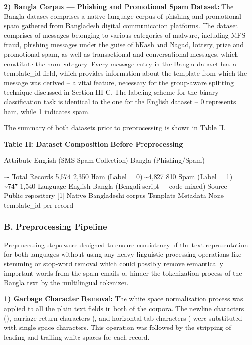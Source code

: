 \textbf{2) Bangla Corpus --- Phishing and Promotional Spam Dataset:} The
Bangla dataset comprises a native language corpus of phishing and
promotional spam gathered from Bangladesh digital communication
platforms. The dataset comprises of messages belonging to various
categories of malware, including MFS fraud, phishing messages under the
guise of bKash and Nagad, lottery, prize and promotional spam, as well
as transactional and conversational messages, which constitute the ham
category. Every message entry in the Bangla dataset has a template\_id
field, which provides information about the template from which the
message was derived -- a vital feature, necessary for the group-aware
splitting technique discussed in Section III-C. The labeling scheme for
the binary classification task is identical to the one for the English
dataset -- 0 represents ham, while 1 indicates spam.

The summary of both datasets prior to preprocessing is shown in Table
II.

\textbf{Table II: Dataset Composition Before Preprocessing}

Attribute \textbar{} English (SMS Spam Collection) \textbar{} Bangla
(Phishing/Spam) \textbar{}

\textbar--\textbar-\textbar\textbar{} \textbar{} Total Records
\textbar{} 5,574 \textbar{} 2,350 \textbar{} \textbar{} Ham (Label = 0)
\textbar{} \textasciitilde4,827 \textbar{} 810 \textbar{} \textbar{}
Spam (Label = 1) \textbar{} \textasciitilde747 \textbar{} 1,540
\textbar{} \textbar{} Language \textbar{} English \textbar{} Bangla
(Bengali script + code-mixed) \textbar{} \textbar{} Source \textbar{}
Public repository {[}1{]} \textbar{} Native Bangladeshi corpus
\textbar{} \textbar{} Template Metadata \textbar{} None \textbar{}
template\_id per record \textbar{}

\subsubsection{B. Preprocessing
Pipeline}\label{b.-preprocessing-pipeline}

Preprocessing steps were designed to ensure consistency of the text
representation for both languages without using any heavy linguistic
processing operations like stemming or stop-word removal which could
possibly remove semantically important words from the spam emails or
hinder the tokenization process of the Bangla text by the multilingual
tokenizer.

\textbf{1) Garbage Character Removal:} The white space normalization
process was applied to all the plain text fields in both of the corpora.
The newline characters (), carriage return characters (, and horizontal
tab characters ( were substituted with single space characters. This
operation was followed by the stripping of leading and trailing white
spaces for each record.

